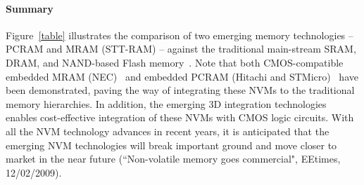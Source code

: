 \paragraph{Summary}
Figure~\ref{table} illustrates the comparison of
two emerging memory technologies -- PCRAM and MRAM (STT-RAM)  --
against the traditional main-stream SRAM, DRAM, and NAND-based Flash memory~\cite{ITRS07}.
Note that both CMOS-compatible embedded MRAM (NEC)~\cite{MRAM:NEC09} and embedded PCRAM (Hitachi and STMicro)~\cite{PRAM:Hitachi2007,PRAM:ST2004} have been demonstrated, paving the way of integrating
these NVMs to the traditional memory hierarchies. In addition, the emerging 3D integration technologies~\cite{xie:jetcs06,Xie:dac08}
enables cost-effective integration of these NVMs with CMOS logic circuits. With all the NVM technology advances in recent years, it is anticipated that the emerging NVM technologies will break important ground and move closer to market in the near future (``Non-volatile memory goes commercial", EEtimes, 12/02/2009).


